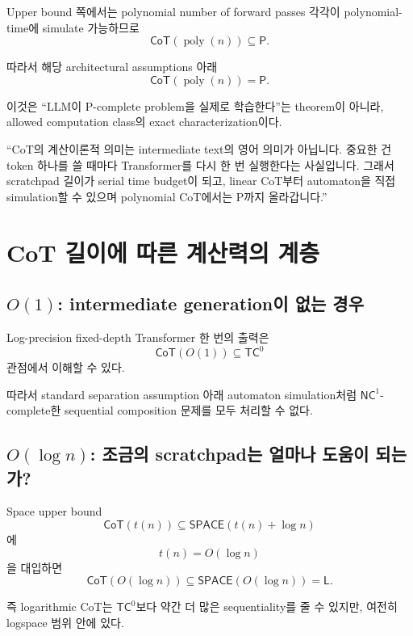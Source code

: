 \documentclass[11pt,a4paper,oneside,openany]{memoir}
\theoremstyle{definition}
\newcommand{\poly}{\operatorname{poly}}
\newcommand{\SPACE}{\mathsf{SPACE}}
\newcommand{\TC}{\mathsf{TC}}
\newcommand{\NC}{\mathsf{NC}}
\newcommand{\CoT}{\mathsf{CoT}}
\newcommand{\Lclass}{\mathsf{L}}
\newcommand{\Pclass}{\mathsf{P}}
\begin{document}
Upper bound 쪽에서는 polynomial number of forward passes 각각이 polynomial-time에 simulate 가능하므로
\[
\CoT(\poly(n))\subseteq\Pclass.
\]

따라서 해당 architectural assumptions 아래
\[
\boxed{\CoT(\poly(n))=\Pclass.}
\]

이것은 ``LLM이 P-complete problem을 실제로 학습한다''는 theorem이 아니라,
allowed computation class의 exact characterization이다.

\begin{presentbox}
``CoT의 계산이론적 의미는 intermediate text의 영어 의미가 아닙니다. 중요한 건 token 하나를 쓸 때마다 Transformer를 다시 한 번 실행한다는 사실입니다. 그래서 scratchpad 길이가 serial time budget이 되고, linear CoT부터 automaton을 직접 simulation할 수 있으며 polynomial CoT에서는 P까지 올라갑니다.''
\end{presentbox}

\chapter{CoT 길이에 따른 계산력의 계층}

\section{\texorpdfstring{$O(1)$: intermediate generation이 없는 경우}{O(1): intermediate generation이 없는 경우}}

Log-precision fixed-depth Transformer 한 번의 출력은
\[
\CoT(O(1))\subseteq\TC^0
\]
관점에서 이해할 수 있다.

따라서 standard separation assumption 아래 automaton simulation처럼 $\NC^1$-complete한 sequential composition 문제를 모두 처리할 수 없다.

\section{\texorpdfstring{$O(\log n)$: 조금의 scratchpad는 얼마나 도움이 되는가?}{O(log n): 조금의 scratchpad는 얼마나 도움이 되는가?}}

Space upper bound
\[
\CoT(t(n))\subseteq\SPACE(t(n)+\log n)
\]
에
\[
t(n)=O(\log n)
\]
을 대입하면
\[
\CoT(O(\log n))\subseteq\SPACE(O(\log n))=\Lclass.
\]

즉 logarithmic CoT는 $\TC^0$보다 약간 더 많은 sequentiality를 줄 수 있지만,
여전히 logspace 범위 안에 있다.
\end{document}
